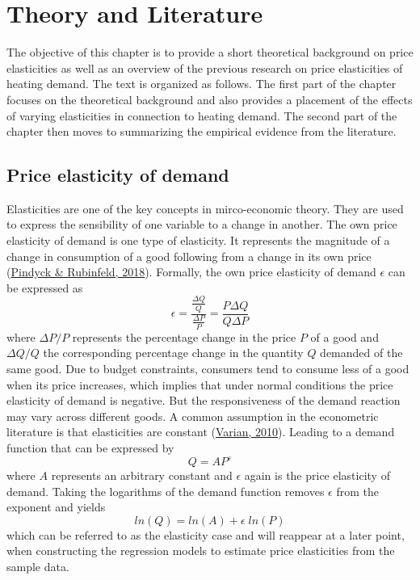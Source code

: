 \documentclass[12pt,twoside]{reedthesis}
\begin{document}
\hypertarget{literature}{%
\chapter{Theory and Literature}\label{literature}}

The objective of this chapter is to provide a short theoretical background on price elasticities as well as an overview of the previous research on price elasticities of heating demand. The text is organized as follows. The first part of the chapter focuses on the theoretical background and also provides a placement of the effects of varying elasticities in connection to heating demand. The second part of the chapter then moves to summarizing the empirical evidence from the literature.

\hypertarget{theory}{%
\section{Price elasticity of demand}\label{theory}}

Elasticities are one of the key concepts in mirco-economic theory. They are used to express the sensibility of one variable to a change in another. The own price elasticity of demand is one type of elasticity. It represents the magnitude of a change in consumption of a good following from a change in its own price (\protect\hyperlink{ref-pindyck_rubinfeld18}{Pindyck \& Rubinfeld, 2018}). Formally, the own price elasticity of demand \(\epsilon\) can be expressed as
\begin{equation}
\epsilon = \frac{\frac{\Delta Q}{Q}}{\frac{\Delta P}{P}} = \frac{P \Delta Q}{Q \Delta P}
\label{eq:ep}
\end{equation}
where \(\Delta P/P\) represents the percentage change in the price \(P\) of a good and \(\Delta Q/Q\) the corresponding percentage change in the quantity \(Q\) demanded of the same good. Due to budget constraints, consumers tend to consume less of a good when its price increases, which implies that under normal conditions the price elasticity of demand is negative. But the responsiveness of the demand reaction may vary across different goods. A common assumption in the econometric literature is that elasticities are constant (\protect\hyperlink{ref-varian10}{Varian, 2010}). Leading to a demand function that can be expressed by
\begin{equation}
Q = AP^{\varepsilon}
\label{eq:demand}
\end{equation}
where \(A\) represents an arbitrary constant and \(\epsilon\) again is the price elasticity of demand. Taking the logarithms of the demand function removes \(\epsilon\) from the exponent and yields
\begin{equation}
ln(Q) = ln(A) + \epsilon \; ln(P)
\label{eq:demand2}
\end{equation}
which can be referred to as the elasticity case and will reappear at a later point, when constructing the regression models to estimate price elasticities from the sample data.
\end{document}
